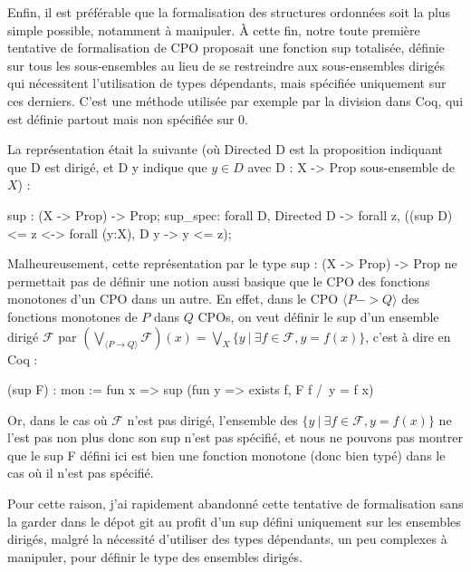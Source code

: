 \documentclass{article}
\newcommand\code[1]{{\fontfamily{lmtt}\selectfont #1}}
\theoremstyle{definition}
\begin{document}
Enfin, il est préférable que la formalisation des structures ordonnées soit la plus simple possible, notamment à manipuler. À cette fin, notre toute première tentative de formalisation de CPO proposait une fonction sup totalisée, définie sur tous les sous-ensembles au lieu de se restreindre aux sous-ensembles dirigés qui nécessitent l'utilisation de types dépendants, mais spécifiée uniquement sur ces derniers. C'est une méthode utilisée par exemple par la division dans Coq, qui est définie partout mais non spécifiée sur $0$. 

La représentation était la suivante (où \code{Directed D} est la proposition indiquant que D est dirigé, et \code{D y} indique que $y \in D$ avec \code{D : X -> Prop} sous-ensemble de $X$) :

\begin{coq}
sup : (X -> Prop) -> Prop;
sup_spec: forall D, Directed D -> forall z, 
			 ((sup D) <= z <-> forall (y:X), D y -> y <= z);
\end{coq}

Malheureusement, cette représentation par le type \code{sup : (X -> Prop) -> Prop} ne permettait pas de définir une notion aussi basique que le CPO des fonctions monotones d'un CPO dans un autre. En effet, dans le CPO $\langle P -> Q \rangle$ des fonctions monotones de $P$ dans $Q$ CPOs, on veut définir le sup d'un ensemble dirigé $\mathcal{F}$ par $(\bigvee_{\langle P \rightarrow Q \rangle} \mathcal{F})(x) = \bigvee_{X} \{y ~ | ~ \exists f \in \mathcal{F}, y = f(x)\}$, c'est à dire en Coq :

\begin{coq}
(sup F) : mon := fun x => sup (fun y => exists f, F f /\ y = f x)
\end{coq}

Or, dans le cas où $\mathcal{F}$ n'est pas dirigé, l'ensemble des $\{y ~ | ~ \exists f \in \mathcal{F}, y = f(x)\}$ ne l'est pas non plus donc son sup n'est pas spécifié, et nous ne pouvons pas montrer que le \code{sup F} défini ici est bien une fonction monotone (donc bien typé) dans le cas où il n'est pas spécifié.

Pour cette raison, j'ai rapidement abandonné cette tentative de formalisation sans la garder dans le dépot git au profit d'un sup défini uniquement sur les ensembles dirigés, malgré la nécessité d'utiliser des types dépendants, un peu complexes à manipuler, pour définir le type des ensembles dirigés.



\end{document}
